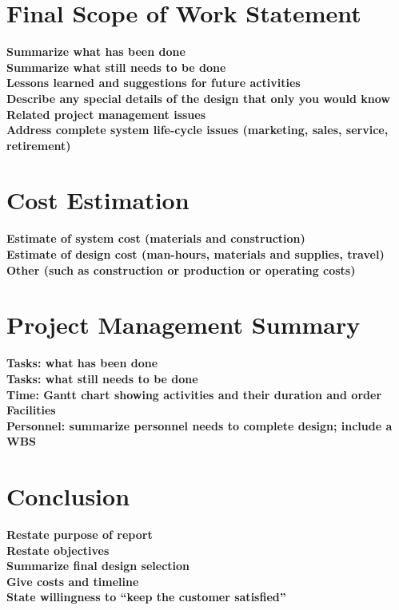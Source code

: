 \documentclass[letterpaper,12pt]{article}
\newcommand{\xxx}[1]{{\color{red}\bf #1}}
\begin{document}
\section{Final Scope of Work Statement}
\label{sec:finalscope}
\xxx{Summarize what has been done} \\
\xxx{Summarize what still needs to be done} \\
\xxx{Lessons learned and suggestions for future activities} \\
\xxx{Describe any special details of the design that only you would know} \\
\xxx{Related project management issues} \\
\xxx{Address complete system life-cycle issues (marketing, sales, service, retirement)}

\section{Cost Estimation}
\label{sec:cost}
\xxx{Estimate of system cost (materials and construction)} \\
\xxx{Estimate of design cost (man-hours, materials and supplies, travel)} \\
\xxx{Other (such as construction or production or operating costs)}

\section{Project Management Summary}
\label{sec:projman}

\xxx{Tasks: what has been done} \\
\xxx{Tasks: what still needs to be done} \\
\xxx{Time: Gantt chart showing activities and their duration and order} \\
\xxx{Facilities} \\
\xxx{Personnel: summarize personnel needs to complete design; include a WBS}

\section{Conclusion}
\label{sec:conclusion}

\xxx{Restate purpose of report} \\
\xxx{Restate objectives} \\
\xxx{Summarize final design selection} \\
\xxx{Give costs and timeline} \\
\xxx{State willingness to ``keep the customer satisfied''}
\end{document}
